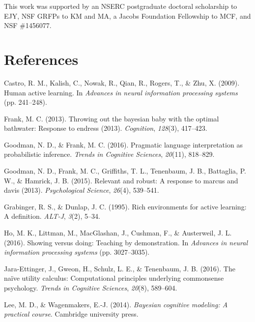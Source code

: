 \documentclass[10pt, letterpaper]{article}
\begin{document}
This work was supported by an NSERC postgraduate doctoral scholarship to
EJY, NSF GRFPs to KM and MA, a Jacobs Foundation Fellowship to MCF, and
NSF \#1456077.

\section{References}\label{references}

\setlength{\parindent}{-0.1in} \setlength{\leftskip}{0.125in}

\noindent

\hypertarget{refs}{}
\hypertarget{ref-castro2009human}{}
Castro, R. M., Kalish, C., Nowak, R., Qian, R., Rogers, T., \& Zhu, X.
(2009). Human active learning. In \emph{Advances in neural information
processing systems} (pp. 241--248).

\hypertarget{ref-frank2013throwing}{}
Frank, M. C. (2013). Throwing out the bayesian baby with the optimal
bathwater: Response to endress (2013). \emph{Cognition}, \emph{128}(3),
417--423.

\hypertarget{ref-goodman2016}{}
Goodman, N. D., \& Frank, M. C. (2016). Pragmatic language
interpretation as probabilistic inference. \emph{Trends in Cognitive
Sciences}, \emph{20}(11), 818--829.

\hypertarget{ref-goodman2015relevant}{}
Goodman, N. D., Frank, M. C., Griffiths, T. L., Tenenbaum, J. B.,
Battaglia, P. W., \& Hamrick, J. B. (2015). Relevant and robust: A
response to marcus and davis (2013). \emph{Psychological Science},
\emph{26}(4), 539--541.

\hypertarget{ref-grabinger1995rich}{}
Grabinger, R. S., \& Dunlap, J. C. (1995). Rich environments for active
learning: A definition. \emph{ALT-J}, \emph{3}(2), 5--34.

\hypertarget{ref-ho2016showing}{}
Ho, M. K., Littman, M., MacGlashan, J., Cushman, F., \& Austerweil, J.
L. (2016). Showing versus doing: Teaching by demonstration. In
\emph{Advances in neural information processing systems} (pp.
3027--3035).

\hypertarget{ref-jara2016}{}
Jara-Ettinger, J., Gweon, H., Schulz, L. E., \& Tenenbaum, J. B. (2016).
The naïve utility calculus: Computational principles underlying
commonsense psychology. \emph{Trends in Cognitive Sciences},
\emph{20}(8), 589--604.

\hypertarget{ref-lee2014bayesian}{}
Lee, M. D., \& Wagenmakers, E.-J. (2014). \emph{Bayesian cognitive
modeling: A practical course}. Cambridge university press.
\end{document}
